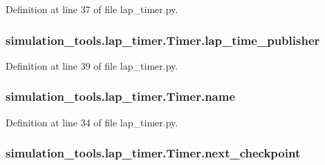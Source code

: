 Definition at line 37 of file lap\+\_\+timer.\+py.

\subsubsection[{\texorpdfstring{lap\+\_\+time\+\_\+publisher}{lap_time_publisher}}]{\setlength{\rightskip}{0pt plus 5cm}simulation\+\_\+tools.\+lap\+\_\+timer.\+Timer.\+lap\+\_\+time\+\_\+publisher}\hypertarget{classsimulation__tools_1_1lap__timer_1_1_timer_a2c9523f33bcf2a72cebb7ccc056a1f53}{}\label{classsimulation__tools_1_1lap__timer_1_1_timer_a2c9523f33bcf2a72cebb7ccc056a1f53}


Definition at line 39 of file lap\+\_\+timer.\+py.

\subsubsection[{\texorpdfstring{name}{name}}]{\setlength{\rightskip}{0pt plus 5cm}simulation\+\_\+tools.\+lap\+\_\+timer.\+Timer.\+name}\hypertarget{classsimulation__tools_1_1lap__timer_1_1_timer_a9bf911e55976cb1d04b10440cea407c1}{}\label{classsimulation__tools_1_1lap__timer_1_1_timer_a9bf911e55976cb1d04b10440cea407c1}


Definition at line 34 of file lap\+\_\+timer.\+py.

\subsubsection[{\texorpdfstring{next\+\_\+checkpoint}{next_checkpoint}}]{\setlength{\rightskip}{0pt plus 5cm}simulation\+\_\+tools.\+lap\+\_\+timer.\+Timer.\+next\+\_\+checkpoint}\hypertarget{classsimulation__tools_1_1lap__timer_1_1_timer_a74b19b620b1f59ce1d558524c275f4c3}{}\label{classsimulation__tools_1_1lap__timer_1_1_timer_a74b19b620b1f59ce1d558524c275f4c3}


